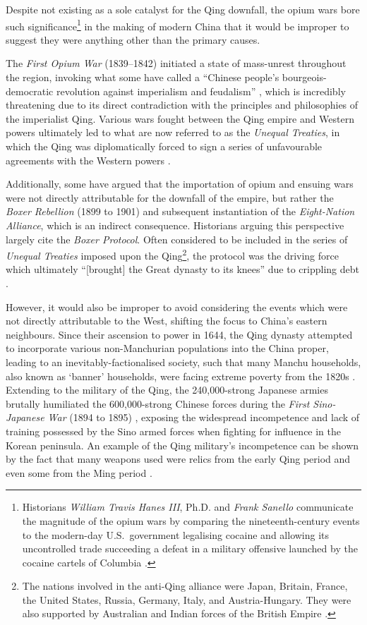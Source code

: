 \documentclass[a4paper,oneside]{article}
\begin{document}
Despite not existing as a sole catalyst for the Qing downfall, the opium wars
bore such significance\footnote{Historians \textit{William Travis Hanes III},
Ph.D. and \textit{Frank Sanello} communicate the magnitude of the opium wars by
comparing the nineteenth-century events to the modern-day U.S.\ government
legalising cocaine and allowing its uncontrolled trade succeeding a defeat in a
military offensive launched by the cocaine cartels of Columbia
\autocite{Hanes:2004}.} in the making of modern China that it would be improper
to suggest they were anything other than the primary causes.

The \textit{First Opium War} (1839--1842) initiated a state of mass-unrest
throughout the region, invoking what some have called a ``Chinese people's
bourgeois-democratic revolution against imperialism and feudalism''
\autocite{Janin:1999}, which is incredibly threatening due to its direct
contradiction with the principles and philosophies of the imperialist Qing.
Various wars fought between the Qing empire and Western powers ultimately led to
what are now referred to as the \textit{Unequal Treaties}, in which the Qing was
diplomatically forced to sign a series of unfavourable agreements with the
Western powers \autocite{Wang:2005}.

Additionally, some have argued that the importation of opium and ensuing wars
were not directly attributable for the downfall of the empire, but rather the
\textit{Boxer Rebellion} (1899 to 1901) and subsequent instantiation of the
\textit{Eight-Nation Alliance}, which is an indirect consequence. Historians
arguing this perspective largely cite the \textit{Boxer Protocol}. Often
considered to be included in the series of \textit{Unequal Treaties} imposed
upon the Qing\footnote{The nations involved in the anti-Qing alliance were
Japan, Britain, France, the United States, Russia, Germany, Italy, and
Austria-Hungary. They were also supported by Australian and Indian forces of the
British Empire \autocite{Gardener:2016}.}, the protocol was the driving force
which ultimately ``[brought] the Great dynasty to its knees'' due to crippling
debt \autocite{Mitchell:2008}.

However, it would also be improper to avoid considering the events which were
not directly attributable to the West, shifting the focus to China's eastern
neighbours. Since their ascension to power in 1644, the Qing dynasty attempted
to incorporate various non-Manchurian populations into the China proper, leading
to an inevitably-factionalised society, such that many Manchu households, also
known as `banner' households, were facing extreme poverty from the 1820s
\autocite{Elliott:2006}.  Extending to the military of the Qing, the
240,000-strong Japanese armies brutally humiliated the 600,000-strong Chinese
forces during the \textit{First Sino-Japanese War} (1894 to 1895)
\autocite{Fenby:2013}, exposing the widespread incompetence and lack of training
possessed by the Sino armed forces \autocite{Jowett:2013} when fighting for
influence in the Korean peninsula. An example of the Qing military's
incompetence can be shown by the fact that many weapons used were relics from
the early Qing period and even some from the Ming period \autocite{Qi:1964}.
\end{document}
